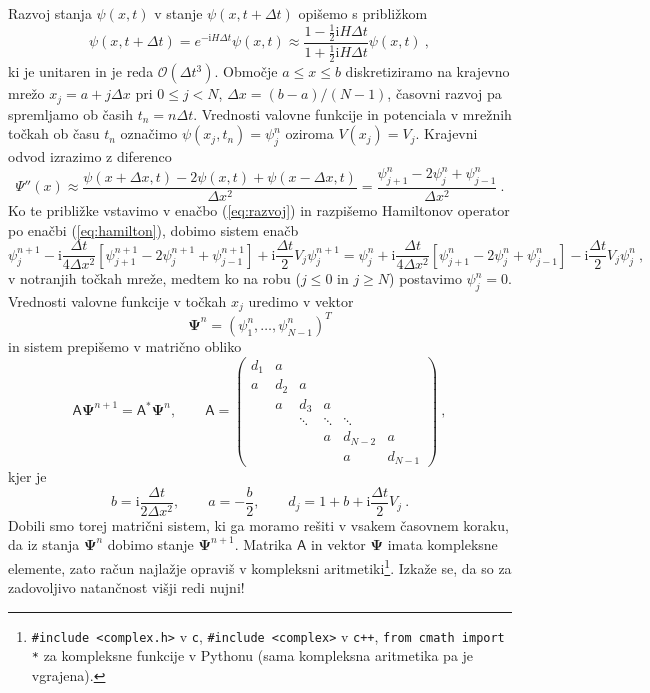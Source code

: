 \documentclass[slovene,11pt,a4paper]{article}
\newcommand{\ii}{\mathrm{i}}
\newcommand{\thalf}{\tfrac{1}{2}}
\begin{document}
Razvoj stanja $\psi(x,t)$ v stanje $\psi(x,t+\Delta t)$ opišemo s približkom
\begin{equation}
  \psi(x,t+\Delta t)=e^{-\ii H \Delta t} \psi(x,t)\approx \frac{1-\thalf \ii H \Delta t}{1+\thalf \ii H \Delta t}\psi(x,t)\>,
  \label{eq:razvoj}
\end{equation}
ki je unitaren in je reda $\mathcal{O}(\Delta t^3)$. Območje $a\leq x\leq b$ diskretiziramo na krajevno mrežo $x_j=a+j\Delta x$ pri $0\leq j<N$, $\Delta x = (b-a)/(N-1)$, časovni razvoj pa spremljamo ob časih $t_n=n\Delta t$. Vrednosti valovne funkcije in potenciala v mrežnih točkah ob času $t_n$ označimo $\psi(x_j,t_n)=\psi_j^n$ oziroma $V(x_j)=V_j$. Krajevni odvod izrazimo z diferenco
\begin{equation*}
  \Psi''(x)\approx \frac{\psi(x+\Delta x,t)-2\psi(x,t)+\psi(x-\Delta x,t)}{\Delta x^2}=\frac{\psi_{j+1}^n - 2\psi_j^n+\psi_{j-1}^n}{\Delta x^2}\>.
\end{equation*}
Ko te približke vstavimo v enačbo (\ref{eq:razvoj}) in razpišemo Hamiltonov operator po enačbi (\ref{eq:hamilton}), dobimo sistem enačb
\begin{equation*}
  \psi_j^{n+1}-\ii\frac{\Delta t}{4\Delta x^2}\left[\psi_{j+1}^{n+1}-2\psi_j^{n+1}+\psi_{j-1}^{n+1}\right] + \ii\frac{\Delta t}{2}V_j \psi_j^{n+1}=  \psi_j^{n}+\ii\frac{\Delta t}{4\Delta x^2}\left[\psi_{j+1}^{n}-2\psi_j^{n}+\psi_{j-1}^{n}\right] - \ii\frac{\Delta t}{2}V_j \psi_j^{n}\>,
\end{equation*}
v notranjih točkah mreže, medtem ko na robu ($j\leq 0$ in $j\geq N$) postavimo $\psi_j^n=0$. Vrednosti valovne funkcije v točkah $x_j$ uredimo v vektor
\begin{equation*}
\boldsymbol{\Psi}^n=(\psi_1^n,\ldots,\psi_{N-1}^n)^T
\end{equation*}
in sistem prepišemo v matrično obliko
\begin{equation*}
  \mathsf{A}\boldsymbol{\Psi}^{n+1}=\mathsf{A}^\ast \boldsymbol{\Psi}^n,\qquad
  \mathsf{A}=\begin{pmatrix}
  d_1 & a \\
  a   & d_2 & a \\
  & a & d_3 & a \\
  & & \ddots & \ddots & \ddots \\
  & & & a & d_{N-2} & a \\
  & & & & a & d_{N-1}
  \end{pmatrix}\>,
\end{equation*}
kjer je
\begin{equation*}
  b=\ii \frac{\Delta t}{2 \Delta x^2},\qquad a=-\frac{b}{2},\qquad d_j = 1+b+\ii \frac{\Delta t}{2}V_j\>.
\end{equation*}
Dobili smo torej matrični sistem, ki ga moramo rešiti v vsakem časovnem koraku, da iz stanja $\boldsymbol{\Psi}^n$ dobimo stanje $\boldsymbol{\Psi}^{n+1}$. Matrika $\mathsf{A}$ in vektor $\boldsymbol{\Psi}$ imata kompleksne elemente, zato račun najlažje opraviš v kompleksni aritmetiki\footnote{
  {\tt \#include <complex.h>} v {\tt c}, {\tt \#include <complex>} v {\tt c++}, {\tt from cmath import *} za kompleksne funkcije v Pythonu (sama kompleksna aritmetika pa je vgrajena).
}. Izkaže se, da so za zadovoljivo natančnost višji redi nujni!
\end{document}
